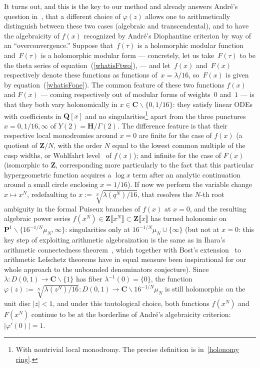 \documentclass[10pt]{amsart}
\renewcommand\setminus{\smallsetminus}
\def\Z{\mathbf{Z}}
\def\Q{\mathbf{Q}}
\renewcommand\mathbb{\mathbf}
\theoremstyle{remark}
\numberwithin{equation}{subsection}
\def\C{\mathbf{C}}
\def\H{\mathbf{H}}
\begin{document}
It turns out, and this is the key to our method and already answers Andr\'e's question in~\cite[Appendix, A.5]{Andre}, 
that a different choice of $\varphi(z)$ allows one to arithmetically distinguish between these two cases (algebraic and transcendental), 
and to have the algebraicity of $f(x)$ recognized by Andr\'e's Diophantine criterion by way of an ``overconvergence.''
Suppose that~$f(\tau)$  is a holomorphic modular function and~$F(\tau)$ is a holomorphic modular form ---
concretely, let us take~$F(\tau)$ to be the theta series of  equation~(\ref{whatisFtwo}), ---
and let~$f(x)$ and~$F(x)$ respectively denote these functions as functions of~$x = \lambda/16$, so~$F(x)$
is given by equation~(\ref{whatisFone}).
The common feature of these two functions $f(x)$ and $F(x)$  --- coming respectively out of modular forms
of weights~$0$ and~$1$ --- is that  they both vary 
holonomically in $x \in \C \setminus \{ 0, 1/16 \}$: they satisfy linear ODEs with coefficients in $\Q[x]$ and no singularities\footnote{With nontrivial local monodromy. The precise definition is in~\ref{holonomy ring}.}
apart from the three punctures $x = 0, 1/16, \infty$ of $Y(2) = \H / \Gamma(2)$. The difference feature is that their respective local monodromies around $x = 0$ are finite for the case of $f(x)$ (a quotient of $\Z/N$, with the order $N$ equal to the lowest common multiple of the cusp widths, or Wohlfahrt level~\cite{Wohlfahrt} of $f(x)$); and infinite for the case of $F(x)$ (isomorphic to $\Z$, corresponding  more  particularly to the fact that this particular hypergeometric function acquires a $\log{x}$ term after an analytic continuation around a small circle enclosing $x = 1/16$). 
If now we perform the variable change $x \mapsto x^N$, redefaulting to $x := \sqrt[N]{\lambda(q^N)/16}$, that resolves the $N$-th root ambiguity 
in the formal Puiseux branches of $f(x)$ at $x = 0$, and the resulting algebraic power series $f(x^N) \in \Z\llbracket x^N \rrbracket \subset \Z\llbracket x \rrbracket$ has turned holonomic on $\mathbb{P}^1 \setminus \{16^{-1/N}\mu_N, \infty\}$: singularities only at $16^{-1/N} \mu_N \cup \{\infty\}$ (but not at $x = 0$: this key step of exploiting arithmetic algebraization is the same as in Ihara's arithmetic connectedness theorem~\cite[Theorem~1]{Ihara}, which together with Bost's extension~\cite{Bost} to arithmetic Lefschetz theorems have in equal measure been inspirational for our whole approach to the unbounded denominators conjecture).  Since $\lambda : D(0,1) \to \C \setminus \{1\}$ has 
fiber $\lambda^{-1}(0) = \{0\}$, the function $\varphi(z):= \sqrt[N]{\lambda(z^N)/16} : D(0,1) \to  \C \setminus 16^{-1/N}\mu_N$ is still 
holomorphic on the unit disc $|z| < 1$, and  under this tautological choice, both functions $f(x^N)$ and $F(x^N)$ continue to be at the borderline of Andr\'e's algebraicity criterion: $|\varphi'(0)| = 1$. 
\end{document}
